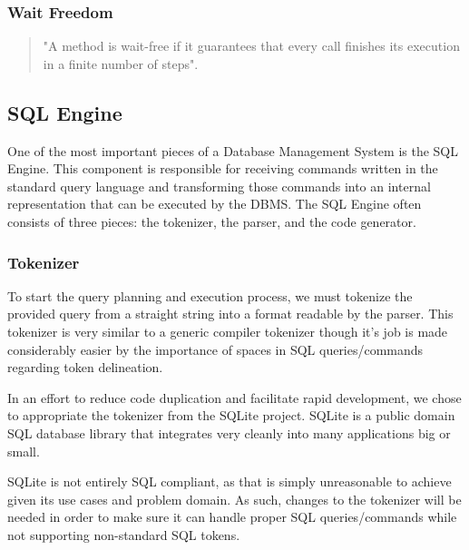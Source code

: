 \documentclass[letterpaper, 12pt]{article}
\renewcommand{\includegraphics}[2][]{\fbox{}}
\begin{document}
\subsubsection{Wait Freedom}
\begin{quotation}
	"A method is wait-free if it guarantees that every call finishes its execution
	in a finite number of steps"\citep[p. 59]{artofmulti}.
\end{quotation}

\newpage


\subsection{SQL Engine}
One of the most important pieces of a Database Management System is the SQL Engine. 
This component is responsible for receiving commands written in the standard query
language and transforming those commands into an internal representation that can be
executed by the DBMS. The SQL Engine often consists of three pieces: the tokenizer, the
parser, and the code generator.


\subsubsection{Tokenizer}
To start the query planning and execution process, we must tokenize the provided query
from a straight string into a format readable by the parser. This tokenizer is very
similar to a generic compiler tokenizer though it's job is made considerably easier 
by the importance of spaces in SQL queries/commands regarding token delineation.
\par\vspace{\baselineskip}
In an effort to reduce code duplication and facilitate rapid development, we chose
to appropriate the tokenizer from the SQLite project. SQLite is a public domain
SQL database library that integrates very cleanly into many applications big
or small.
\par\vspace{\baselineskip}
SQLite is not entirely SQL compliant, as that is simply unreasonable to achieve
given its use cases and problem domain. As such, changes to the tokenizer will be
needed in order to make sure it can handle proper SQL queries/commands while 
not supporting non-standard SQL tokens.
\end{document}
